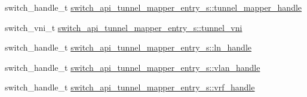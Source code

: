 \begin{DoxyCompactItemize}
\item 
switch\+\_\+handle\+\_\+t \hyperlink{group__Tunnel_ga57c05fa2b7375ae67c1ec2c14e44b4c6}{switch\+\_\+api\+\_\+tunnel\+\_\+mapper\+\_\+entry\+\_\+s\+::tunnel\+\_\+mapper\+\_\+handle}
\item 
switch\+\_\+vni\+\_\+t \hyperlink{group__Tunnel_ga6df67b78ae859af0bd8c54bffe5a25a6}{switch\+\_\+api\+\_\+tunnel\+\_\+mapper\+\_\+entry\+\_\+s\+::tunnel\+\_\+vni}
\item 
switch\+\_\+handle\+\_\+t \hyperlink{group__Tunnel_gafbb8e8e313ad0a67bc337a6a29878a7c}{switch\+\_\+api\+\_\+tunnel\+\_\+mapper\+\_\+entry\+\_\+s\+::ln\+\_\+handle}
\item 
switch\+\_\+handle\+\_\+t \hyperlink{group__Tunnel_ga15e98ca4e3a4039ada5611919b7b6a53}{switch\+\_\+api\+\_\+tunnel\+\_\+mapper\+\_\+entry\+\_\+s\+::vlan\+\_\+handle}
\item 
switch\+\_\+handle\+\_\+t \hyperlink{group__Tunnel_ga394a19941f2d37aa9e323044f18e349b}{switch\+\_\+api\+\_\+tunnel\+\_\+mapper\+\_\+entry\+\_\+s\+::vrf\+\_\+handle}
\end{DoxyCompactItemize}


